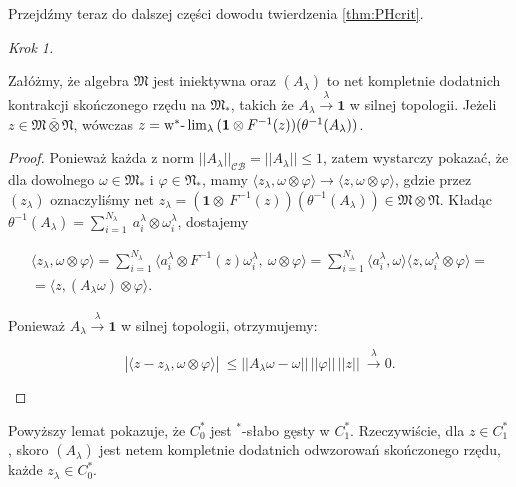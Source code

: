 Przejdźmy teraz do dalszej części dowodu twierdzenia \ref{thm:PHcrit}.

{\it Krok 1.}
\begin{Lemma}
\label{lem:netinvNalg}
Załóżmy, że algebra $\mathfrak{M}$ jest iniektywna oraz
$(A_{\lambda})$ to net kompletnie dodatnich kontrakcji skończonego rzędu na
$\mathfrak{M}_{*}$, takich że
$A_{\lambda} \stackrel{\lambda}{\rightarrow} \mathbf{1}$ w silnej topologii.
Jeżeli $z \in \mathfrak{M} \bar{\otimes} \mathfrak{N}$, wówczas
$z = {\rm w}^*\mbox{-}\lim_{\lambda} \, (\mathbf{1} \otimes F^{-1}(z) )
(\theta^{-1} (A_{\lambda}))$.
\end{Lemma}
\begin{proof}
Ponieważ każda z norm $||A_{\lambda}||_{\mathcal{CB}} = || A_{\lambda} ||  \leq 1$,
zatem wystarczy pokazać, że dla dowolnego $\omega \in \mathfrak{M}_{*}$
i $\varphi \in \mathfrak{N}_{*}$,
mamy
$\langle z_{\lambda}, \omega \otimes \varphi\rangle{\longrightarrow}
\langle z , \omega \otimes \varphi\rangle$,
gdzie przez $(z_{\lambda})$ oznaczyliśmy net $z_{\lambda} = (\mathbf{1} \otimes \
F^{-1}(z))(\theta^{-1}(A_{\lambda})) \in \mathfrak{M} \otimes \mathfrak{N}$.
Kładąc
$\theta^{-1}(A_{\lambda}) = \sum_{i=1}^{N_{\lambda}} \
a_{i}^{\lambda} \otimes \omega_{i}^{\lambda}$, dostajemy
\begin{linenomath*}
 \begin{multline}
\langle z_{\lambda}, \omega \otimes \varphi\rangle =
\sum \limits_{i=1}^{N_{\lambda}}
\langle a_{i}^{\lambda} \otimes F^{-1}(z) \omega_{i}^{\lambda} ,\
\omega \otimes \varphi \rangle
= \sum \limits_{i=1}^{N_{\lambda}}
\langle  a_{i}^{\lambda}, \omega \rangle
\langle z,  \omega_{i}^{\lambda} \otimes \varphi \rangle = \\
= \langle z , (A_{\lambda} \omega) \otimes \varphi \rangle.
 \end{multline}
\end{linenomath*}
Ponieważ $A_{\lambda} \stackrel{\lambda}{\rightarrow} \mathbf{1}$ w silnej topologii,
otrzymujemy:
\begin{linenomath*}
 \begin{equation}
| \langle z - z_{\lambda}, \omega\otimes \varphi \rangle | \
\leq || A_{\lambda} \omega - \omega || \, ||\varphi|| \, ||z|| \
\stackrel{\lambda}{\longrightarrow} 0.
 \end{equation}
\end{linenomath*}
\end{proof}

\begin{Corollary}
\label{cor:denseness}
Powyższy lemat pokazuje, że $C_0^*$ jest $^{*}$-słabo gęsty w $C_1^*$.
Rzeczywiście, dla
$z \in C_{1}^{*}$, skoro $(A_{\lambda})$ jest netem kompletnie dodatnich
odwzorowań skończonego rzędu, każde $z_{\lambda} \in C_{0}^{*}$.
\end{Corollary}

